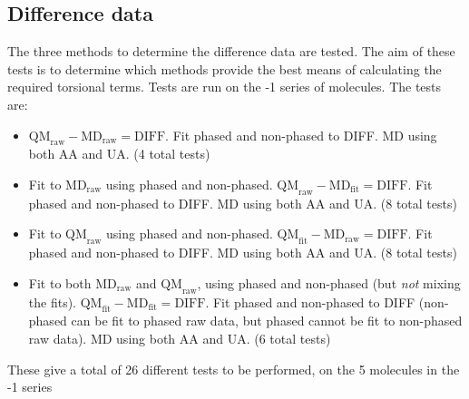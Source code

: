 \documentclass[11pt, oneside, draft]{article}   	%
\begin{document}
\subsection{Difference data}
The three methods to determine the difference data are tested. The aim of these tests is to determine which methods provide the best means of calculating the required torsional terms. Tests are run on the -1 series of molecules. The tests are:
\begin{itemize}
\item $\text{QM}_{\text{raw}} - \text{MD}_{\text{raw}} = \text{DIFF}$. Fit phased and non-phased to DIFF. MD using both AA and UA. (4 total tests)
\item Fit to $\text{MD}_{\text{raw}}$ using phased and non-phased. $\text{QM}_{\text{raw}} - \text{MD}_{\text{fit}} = \text{DIFF}$. Fit phased and non-phased to DIFF. MD using both AA and UA. (8 total tests)
\item Fit to $\text{QM}_{\text{raw}}$ using phased and non-phased. $\text{QM}_{\text{fit}} - \text{MD}_{\text{raw}} = \text{DIFF}$. Fit phased and non-phased to DIFF. MD using both AA and UA. (8 total tests)
\item Fit to both $\text{MD}_{\text{raw}}$ and $\text{QM}_{\text{raw}}$, using phased and non-phased (but \emph{not} mixing the fits). $\text{QM}_{\text{fit}} - \text{MD}_{\text{fit}} = \text{DIFF}$. Fit phased and non-phased to DIFF (non-phased can be fit to phased raw data, but phased cannot be fit to non-phased raw data). MD using both AA and UA. (6 total tests)
\end{itemize}
These give a total of 26 different tests to be performed, on the 5 molecules in the -1 series
\end{document}
